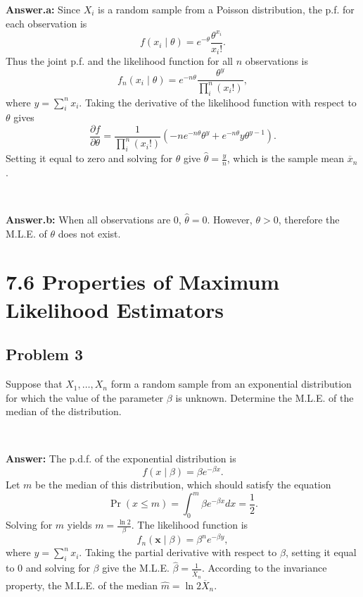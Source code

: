 \documentclass{article}
\begin{document}
\textbf{Answer.a:} Since $X_i$ is a random sample from a Poisson distribution, the p.f. for each observation is
\begin{equation*}
f(x_i \mid \theta) = e^{-\theta} \frac{\theta^{x_i}}{x_i!}.
\end{equation*}
Thus the joint p.f. and the likelihood function for all $n$ observations is 
\begin{equation*}
f_n(x_i \mid \theta) = e^{-n\theta} \frac{\theta^y}{\prod_i^n(x_i!)},
\end{equation*}
where $y = \sum_i^n x_i$. Taking the derivative of the likelihood function with respect to $\theta$ gives
\begin{equation*}
\frac{\partial f}{\partial \theta} = \frac{1}{\prod_i^n(x_i!)}(-ne^{-n\theta} \theta^y + e^{-n \theta} y \theta^{y-1}).
\end{equation*}
Setting it equal to zero and solving for $\theta$ give $\hat{\theta} = \frac{y}{n}$, which is the sample mean $\overline{x}_n$.

\

\textbf{Answer.b:} When all observations are 0,  $\hat{\theta} = 0$. However, $\theta > 0$, therefore the M.L.E. of $\theta$ does not exist.

\newpage

\section*{7.6 Properties of Maximum Likelihood Estimators}
\subsection*{Problem 3}
Suppose that $X_1, \dots, X_n$ form a random sample from an exponential distribution for which the value of the parameter $\beta$ is unknown. Determine the M.L.E. of the median of the distribution.

\

\textbf{Answer:} The p.d.f. of the exponential distribution is 
\begin{equation*}
f(x \mid \beta) = \beta e^{- \beta x}.
\end{equation*}
Let $m$ be the median of this distribution, which should satisfy the equation
\begin{equation*}
\Pr(x \le m) = \int_0^m \beta e^{- \beta x} dx= \frac{1}{2}.
\end{equation*}
Solving for $m$ yields $m = \frac{\ln2}{\beta}$.
The likelihood function is
\begin{equation*}
f_n(\boldsymbol{x} \mid \beta) = \beta^n e^{-\beta y},
\end{equation*}
where $y = \sum_i^n x_i$.
Taking the partial derivative with respect to $\beta$, setting it equal to 0 and solving for $\beta$ give the M.L.E. $\hat{\beta} = \frac{1}{\overline{X}_n}$. According to the invariance property, the M.L.E. of the median $\hat{m} = \ln2 \overline{X}_n$.
\end{document}
